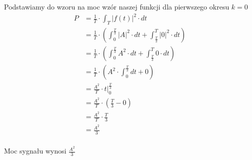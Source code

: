 \begin{task}
Podstawiamy do wzoru na moc wzór naszej funkcji dla pierwszego okresu $k=0$
\begin{align*}
P&=\frac{1}{T} \cdot \int_{T}\left|f(t)\right|^2 \cdot dt \\
&=\frac{1}{T} \cdot \left( \int_{0}^{\frac{T}{3}}\left| A \right|^2 \cdot dt + \int_{\frac{T}{3}}^{T}\left| 0 \right|^2 \cdot dt\right)\\
&=\frac{1}{T} \cdot \left( \int_{0}^{\frac{T}{3}} A ^2 \cdot dt + \int_{\frac{T}{3}}^{T}0 \cdot dt\right)\\
&=\frac{1}{T} \cdot \left( A ^2 \cdot \int_{0}^{\frac{T}{3}} dt + 0\right)\\
&=\frac{A^2}{T} \cdot \left. t \right|_{0}^{\frac{T}{3}}\\
&=\frac{A^2}{T} \cdot \left( \frac{T}{3} - 0 \right)\\
&=\frac{A^2}{T} \cdot \frac{T}{3}\\
&=\frac{A^2}{3}\\
\end{align*}

Moc sygnału wynosi $\frac{A^2}{3}$
\end{task}